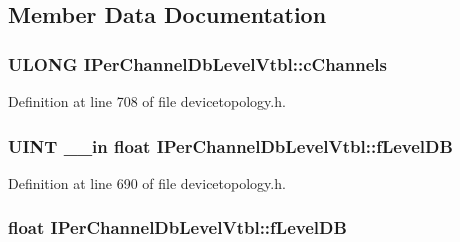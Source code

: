 \subsection{Member Data Documentation}
\subsubsection[{\texorpdfstring{c\+Channels}{cChannels}}]{ {\bf U\+L\+O\+NG} I\+Per\+Channel\+Db\+Level\+Vtbl\+::c\+Channels}\hypertarget{struct_i_per_channel_db_level_vtbl_abd4bea7c51e69f5dafa135abea6b4895}{}\label{struct_i_per_channel_db_level_vtbl_abd4bea7c51e69f5dafa135abea6b4895}


Definition at line 708 of file devicetopology.\+h.

\subsubsection[{\texorpdfstring{f\+Level\+DB}{fLevelDB}}]{ {\bf U\+I\+NT} {\bf \+\_\+\+\_\+in} float I\+Per\+Channel\+Db\+Level\+Vtbl\+::f\+Level\+DB}\hypertarget{struct_i_per_channel_db_level_vtbl_a21a9e765be9c09e77c7a53cadd7435dd}{}\label{struct_i_per_channel_db_level_vtbl_a21a9e765be9c09e77c7a53cadd7435dd}


Definition at line 690 of file devicetopology.\+h.

\subsubsection[{\texorpdfstring{f\+Level\+DB}{fLevelDB}}]{ float I\+Per\+Channel\+Db\+Level\+Vtbl\+::f\+Level\+DB}\hypertarget{struct_i_per_channel_db_level_vtbl_a8f3128a3cce09ddc2d54b64ab9ecd6c3}{}\label{struct_i_per_channel_db_level_vtbl_a8f3128a3cce09ddc2d54b64ab9ecd6c3}


